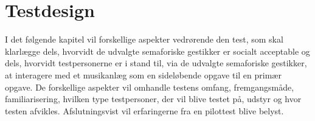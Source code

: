 \chapter{Testdesign}
\label{TestdesignSocialAccept}
%
I det følgende kapitel vil forskellige aspekter vedrørende den test, som skal klarlægge dels, hvorvidt de udvalgte semaforiske gestikker er socialt acceptable og dels, hvorvidt testpersonerne er i stand til, via de udvalgte semaforiske gestikker, at interagere med et musikanlæg som en sideløbende opgave til en primær opgave. De forskellige aspekter vil omhandle testens omfang, fremgangsmåde, familiarisering, hvilken type testpersoner, der vil blive testet på, udstyr og hvor testen afvikles. Afslutningsvist vil erfaringerne fra en pilottest blive belyst.